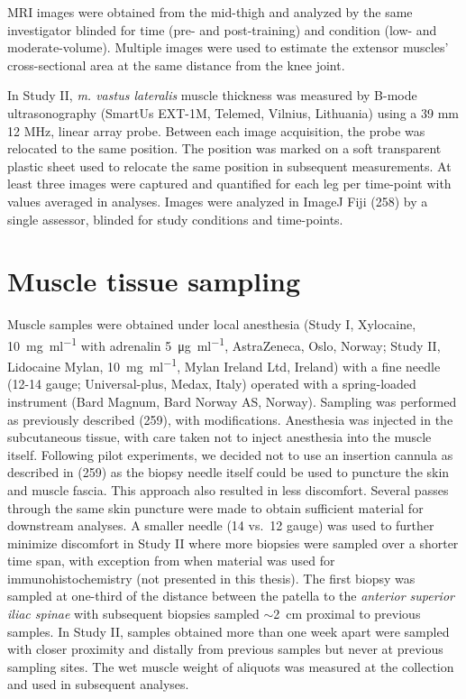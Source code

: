 \documentclass[twoside,10pt]{gihclass} %
\begin{document}
MRI images were obtained from the mid-thigh and analyzed by the same investigator blinded for time (pre- and post-training) and condition (low- and moderate-volume). Multiple images were used to estimate the extensor muscles' cross-sectional area at the same distance from the knee joint.

In Study II, \emph{m. vastus lateralis} muscle thickness was measured by B-mode ultrasonography (SmartUs EXT-1M, Telemed, Vilnius, Lithuania) using a 39 mm 12 MHz, linear array probe. Between each image acquisition, the probe was relocated to the same position. The position was marked on a soft transparent plastic sheet used to relocate the same position in subsequent measurements.
At least three images were captured and quantified for each leg per time-point with values averaged in analyses. Images were analyzed in ImageJ Fiji (258) by a single assessor, blinded for study conditions and time-points.

\hypertarget{muscle-tissue-sampling}{%
\section{Muscle tissue sampling}\label{muscle-tissue-sampling}}

Muscle samples were obtained under local anesthesia (Study I, Xylocaine,
\SI{10}{\mg\per\ml} with adrenalin \SI{5}{\micro\gram\per\ml},
AstraZeneca, Oslo, Norway; Study II, Lidocaine Mylan, \SI{10}{\mg\per\ml}, Mylan Ireland Ltd, Ireland) with a fine needle (12-14 gauge; Universal-plus, Medax, Italy) operated with a spring-loaded instrument (Bard Magnum, Bard Norway AS, Norway). Sampling was performed as previously described (259), with modifications. Anesthesia was injected in the subcutaneous tissue, with care taken not to inject anesthesia into the muscle itself. Following pilot experiments, we decided not to use an insertion cannula as described in (259) as the biopsy needle itself could be used to puncture the skin and muscle fascia. This approach also resulted in less discomfort. Several passes through the same skin puncture were made to obtain sufficient material for downstream analyses. A smaller needle (14 vs.~12 gauge) was used to further minimize discomfort in Study II where more biopsies were sampled over a shorter time span, with exception from when material was used for immunohistochemistry (not presented in this thesis). The first biopsy was
sampled at one-third of the distance between the patella to the \emph{anterior superior iliac spinae} with subsequent biopsies sampled \(\sim\)\SI{2}{cm} proximal to previous samples. In Study II, samples obtained more than one week apart were sampled with closer proximity and distally from previous samples but never at previous sampling sites. The wet muscle weight of aliquots was measured at the collection and used in subsequent analyses.
\end{document}
